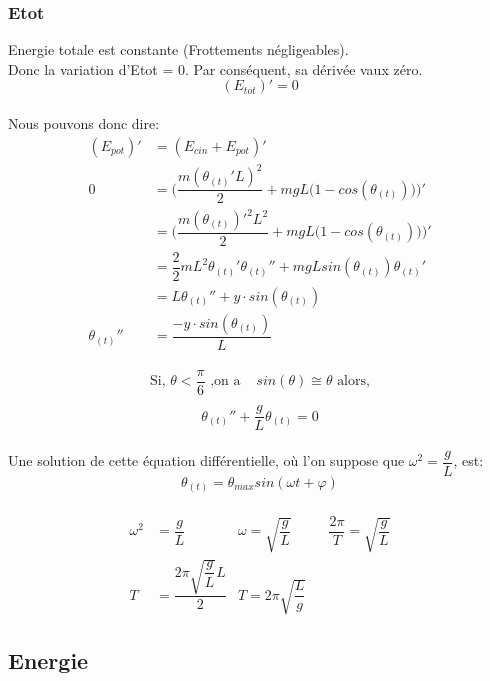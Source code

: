 \documentclass[11pt]{article}
\begin{document}
\subsubsection{Etot}
Energie totale est constante (Frottements négligeables). \\
Donc la variation d'Etot = 0. Par conséquent, sa dérivée vaux zéro.\\
$$(E_{tot})'=0$$ \\
Nous pouvons donc dire:
\begin{equation}
\begin{split}
    (E_{pot})'  & = (E_{cin} + E_{pot})' \\
    0 & = \Bigg( \dfrac{m(\theta_{(t)}' L)^2}{2} + mgL\Big(1-cos(\theta_{(t)})\Big)\Bigg)' \\
    & = \Bigg( \dfrac{m(\theta_{(t)})'^2 L^2}{2} + mgL\Big(1-cos(\theta_{(t)})\Big)\Bigg)' \\
    & = \dfrac{2}{2}mL^2 \theta_{(t)} ' \theta_{(t)}'' + mgLsin(\theta_{(t)})\theta_{(t)}' \\
    & = L \theta_{(t)}'' + y\cdot sin(\theta_{(t)}) \\
    \theta_{(t)}'' & =\dfrac{ -y\cdot sin(\theta_{(t)})}{L}
\end{split}
\end{equation}


\begin{equation}
\begin{split}
\text{Si, } \theta < \dfrac{\pi}{6} \text{ ,on a } & sin(\theta) \cong \theta \text{ alors,}\\
\end{split}
\end{equation}
$$\theta_{(t)}'' + \dfrac{g}{L} \theta_{(t)} = 0$$ \\
Une solution de cette équation différentielle, où l'on suppose que $\omega^2 = \dfrac{g}{L}$,  est: \\
$$\theta_{(t)} = \theta_{max} sin(\omega t + \varphi)$$\\
\begin{align*}
    \omega^2 & = \dfrac{g}{L} 
    & \omega = \sqrt{\dfrac{g}{L}}&
    &\dfrac{2\pi}{T}  = \sqrt{\dfrac{g}{L}}\\
    T & = \dfrac{2\pi \sqrt{\dfrac{g}{L}}L}{2}
    & T = 2\pi \sqrt{\dfrac{L}{g}} &
\end{align*}

\subsection{Energie}
\end{document}
